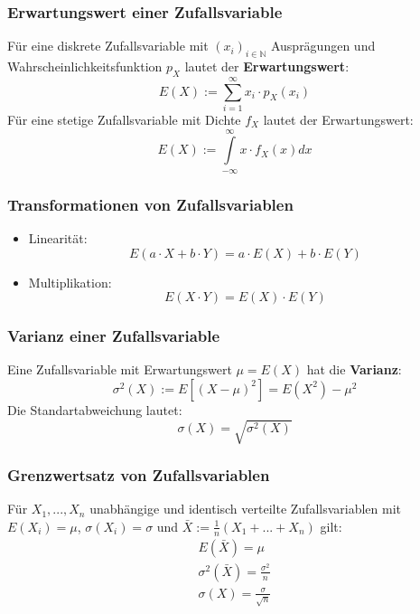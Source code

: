 \documentclass[12pt]{article}
\begin{document}
\subsubsection{Erwartungswert einer Zufallsvariable}
Für eine diskrete Zufallsvariable mit $(x_i)_{i\in \mathbb{N}}$ Ausprägungen und Wahrscheinlichkeitsfunktion $p_X$ lautet der \textbf{Erwartungswert}:
\begin{equation*}
	E(X):=\sum\limits_{i=1}^\infty x_i\cdot p_X(x_i)
\end{equation*}
Für eine stetige Zufallsvariable mit Dichte $f_X$ lautet der Erwartungswert:
\begin{equation*}
	E(X):=\int\limits_{-\infty}^\infty x\cdot f_X(x) dx
\end{equation*}
\subsubsection{Transformationen von Zufallsvariablen}
\begin{itemize}
	\item Linearität:
	\begin{equation*}
		E(a\cdot X + b\cdot Y)=a\cdot E(X)+b\cdot E(Y)
	\end{equation*}
	\item Multiplikation:
	\begin{equation*}
		E(X\cdot Y) = E(X)\cdot E(Y)
	\end{equation*}
\end{itemize}
\subsubsection{Varianz einer Zufallsvariable}
Eine Zufallsvariable mit Erwartungswert $\mu = E(X)$ hat die \textbf{Varianz}:
\begin{equation*}
	\sigma^2(X):=E[(X-\mu)^2]=E(X^2)-\mu^2
\end{equation*}
Die Standartabweichung lautet:
\begin{equation*}
	\sigma(X) = \sqrt{\sigma^2(X)}
\end{equation*}
\subsubsection{Grenzwertsatz von Zufallsvariablen}
Für $X_1,...,X_n$ unabhängige und identisch verteilte Zufallsvariablen mit $E(X_i)=\mu$, $\sigma(X_i)=\sigma$ und $\bar{X}:=\frac{1}{n}(X_1+...+X_n)$ gilt:
\begin{gather*}
	E(\bar{X})=\mu \\
	\sigma^2(\bar{X})=\frac{\sigma^2}{n}\\
	\sigma(X)=\frac{\sigma}{\sqrt{n}}
\end{gather*}
\end{document}
